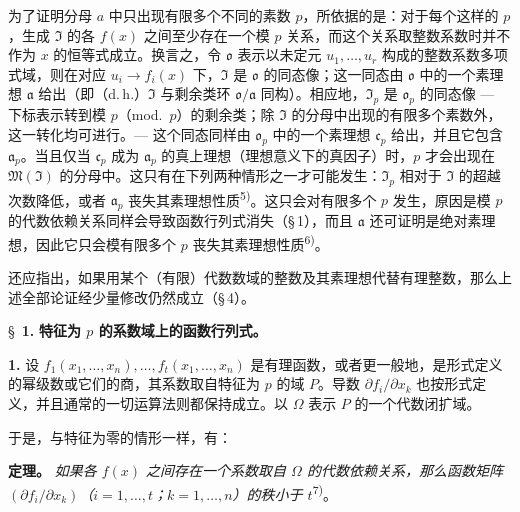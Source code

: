 \documentclass[11pt]{article}
\begin{document}
为了证明分母 $a$ 中只出现有限多个不同的素数 $p$，所依据的是：对于每个这样的 $p$，生成 $\mathfrak{I}$ 的各 $f(x)$ 之间至少存在一个模 $p$ 关系，而这个关系取整数系数时并不作为 $x$ 的恒等式成立。换言之，令 $\mathfrak{o}$ 表示以未定元 $u_1,\ldots,u_r$ 构成的整数系数多项式域，则在对应 $u_i \to f_i(x)$ 下，$\mathfrak{I}$ 是 $\mathfrak{o}$ 的同态像；这一同态由 $\mathfrak{o}$ 中的一个素理想 $\mathfrak{a}$ 给出（即（d.\,h.）$\mathfrak{I}$ 与剩余类环 $\mathfrak{o}/\mathfrak{a}$ 同构）。相应地，$\mathfrak{I}_p$ 是 $\mathfrak{o}_p$ 的同态像 --- 下标表示转到模 $p$（mod.\ $p$）的剩余类；除 $\mathfrak{I}$ 的分母中出现的有限多个素数外，这一转化均可进行。--- 这个同态同样由 $\mathfrak{o}_p$ 中的一个素理想 $\mathfrak{c}_p$ 给出，并且它包含 $\mathfrak{a}_p$。当且仅当 $\mathfrak{c}_p$ 成为 $\mathfrak{a}_p$ 的真上理想（理想意义下的真因子）时，$p$ 才会出现在 $\mathfrak{M}(\mathfrak{I})$ 的分母中。这只有在下列两种情形之一才可能发生：$\mathfrak{I}_p$ 相对于 $\mathfrak{I}$ 的超越次数降低，或者 $\mathfrak{a}_p$ 丧失其素理想性质\textsuperscript{5)}。这只会对有限多个 $p$ 发生，原因是模 $p$ 的代数依赖关系同样会导致函数行列式消失（\S\,1），而且 $\mathfrak{a}$ 还可证明是绝对素理想，因此它只会模有限多个 $p$ 丧失其素理想性质\textsuperscript{6)}。

还应指出，如果用某个（有限）代数数域的整数及其素理想代替有理整数，那么上述全部论证经少量修改仍然成立（\S\,4）。

\bigskip
\S~\textbf{1.}
\textbf{特征为 $p$ 的系数域上的函数行列式。}

\smallskip

\noindent\textbf{1.}
设 $f_1(x_1,\ldots,x_n),\ldots,f_t(x_1,\ldots,x_n)$ 是有理函数，或者更一般地，是形式定义的幂级数或它们的商，其系数取自特征为 $p$ 的域 $P$。导数 $\partial f_i/\partial x_k$ 也按形式定义，并且通常的一切运算法则都保持成立。以 $\Omega$ 表示 $P$ 的一个代数闭扩域。

于是，与特征为零的情形一样，有：

\noindent\textbf{定理。}
\textit{如果各 $f(x)$ 之间存在一个系数取自 $\Omega$ 的代数依赖关系，那么函数矩阵 $(\partial f_i/\partial x_k)$（$i=1,\ldots,t$；$k=1,\ldots,n$）的秩小于 $t$}\textsuperscript{7)}。
\end{document}
